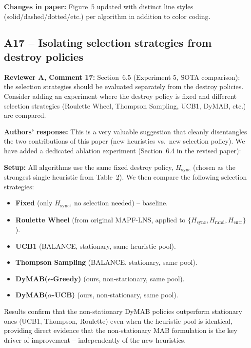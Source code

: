 \documentclass[review]{jair}
\begin{document}
\begin{changebox}
\textbf{Changes in paper:} Figure~5 updated with distinct line styles (solid/dashed/dotted/etc.) per algorithm in addition to color coding.
\end{changebox}

\subsection*{A17 -- Isolating selection strategies from destroy policies}

\begin{reviewerbox}
\textbf{Reviewer A, Comment 17:} Section~6.5 (Experiment 5, SOTA comparison): the selection strategies should be evaluated separately from the destroy policies. Consider adding an experiment where the destroy policy is fixed and different selection strategies (Roulette Wheel, Thompson Sampling, UCB1, DyMAB, etc.) are compared.
\end{reviewerbox}

\begin{authorbox}
\textbf{Authors' response:} This is a very valuable suggestion that cleanly disentangles the two contributions of this paper (new heuristics vs.\ new selection policy). We have added a dedicated ablation experiment (Section~6.4 in the revised paper):

\textbf{Setup:} All algorithms use the same fixed destroy policy, $H_{\text{sync}}$ (chosen as the strongest single heuristic from Table~2). We then compare the following selection strategies:
\begin{itemize}[leftmargin=2em]
  \item \textbf{Fixed} (only $H_{\text{sync}}$, no selection needed) -- baseline.
  \item \textbf{Roulette Wheel} (from original MAPF-LNS, applied to $\{H_{\text{sync}}, H_{\text{rand}}, H_{\text{entr}}\}$).
  \item \textbf{UCB1} (BALANCE, stationary, same heuristic pool).
  \item \textbf{Thompson Sampling} (BALANCE, stationary, same pool).
  \item \textbf{DyMAB($\epsilon$-Greedy)} (ours, non-stationary, same pool).
  \item \textbf{DyMAB($\alpha$-UCB)} (ours, non-stationary, same pool).
\end{itemize}
Results confirm that the non-stationary DyMAB policies outperform stationary ones (UCB1, Thompson, Roulette) even when the heuristic pool is identical, providing direct evidence that the non-stationary MAB formulation is the key driver of improvement -- independently of the new heuristics.
\end{authorbox}
\end{document}
